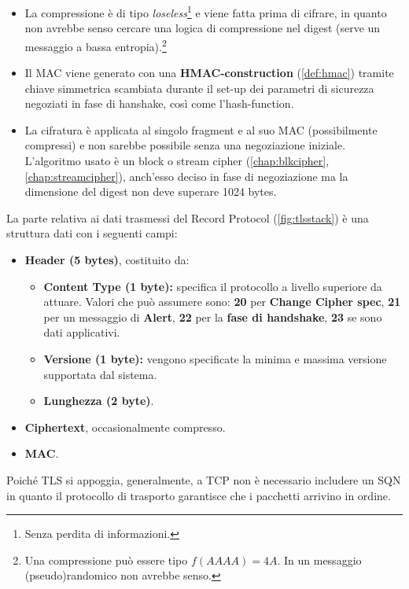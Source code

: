 \begin{itemize}
    \item La compressione è di tipo \textit{loseless}\footnote{Senza perdita di informazioni.} e viene fatta prima di cifrare, in quanto non avrebbe senso cercare una logica di compressione nel digest (serve un messaggio a bassa entropia).\footnote{Una compressione può essere tipo $f(AAAA) = 4A$. In un messaggio (pseudo)randomico non avrebbe senso.}
    \item Il MAC viene generato con una \textbf{HMAC-construction} (\cref{def:hmac}) tramite chiave simmetrica scambiata durante il set-up dei parametri di sicurezza negoziati in fase di hanshake, così come l'hash-function.
    \item La cifratura è applicata al singolo fragment e al suo MAC (possibilmente compressi) e non sarebbe possibile senza una negoziazione iniziale. L'algoritmo usato è un block o stream cipher (\cref{chap:blkcipher}, \cref{chap:streamcipher}), anch'esso deciso in fase di negoziazione ma la dimensione del digest non deve superare 1024 bytes.
\end{itemize}
La parte relativa ai dati trasmessi del Record Protocol (\cref{fig:tlsstack}) è una struttura dati con i seguenti campi:
\begin{definition}
\begin{itemize}
    \item \textbf{Header (5 bytes)}, costituito da:
    \begin{itemize}
        \item \textbf{Content Type (1 byte):} specifica il protocollo a livello superiore da attuare. Valori che può assumere sono: \textbf{20} per \textbf{Change Cipher spec}, \textbf{21} per un messaggio di \textbf{Alert}, \textbf{22} per la \textbf{fase di handshake}, \textbf{23} se sono dati applicativi.
        \item \textbf{Versione (1 byte):} vengono specificate la minima e massima versione supportata dal sistema. 
        \item \textbf{Lunghezza (2 byte)}.
    \end{itemize}
    \item \textbf{Ciphertext}, occasionalmente compresso.
    \item \textbf{MAC}.
\end{itemize}
\begin{remark}
Poiché TLS si appoggia, generalmente, a TCP non è necessario includere un SQN in quanto il protocollo di trasporto garantisce che i pacchetti arrivino in ordine.
\end{remark}
\end{definition}
